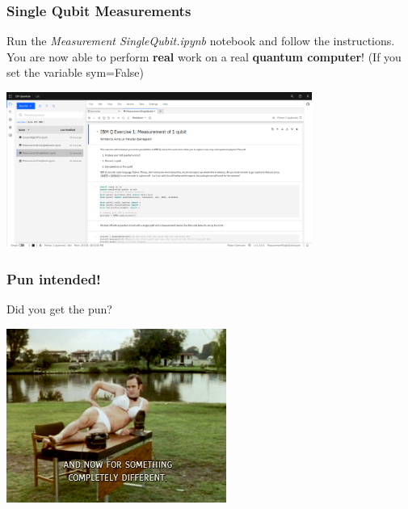\documentclass[10pt]{beamer}
\begin{document}
\begin{frame}
  \frametitle{Single Qubit Measurements}
  Run the \emph{Measurement SingleQubit.ipynb} notebook and follow the instructions. You are now able to perform \textbf{real} work on a real \textbf{quantum computer}! (If you set the variable sym=False)
  \begin{center}
  \includegraphics[width=10cm]{img/ibmq-single-qubit.png}
  \end{center}
\end{frame}

\begin{frame}
  \frametitle{Pun intended!}
 Did you get the pun? 
  \begin{center}
  \includegraphics[width=7.2cm]{img/completely-different.png}
  \end{center}
\end{frame}
\end{document}
